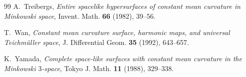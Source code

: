 \documentclass[12pt,a4paper,reqno]{amsart}
\theoremstyle{plain} %
\theoremstyle{definition}
\begin{document}
\begin{thebibliography}{99}
A.~Treibergs, {\it Entire spacelike hypersurfaces of constant mean curvature in Minkowski space}, Invent. Math. {\bf 66} (1982), 39--56.

T.~Wan, {\it Constant mean curvature surface, harmonic maps, and universal Teichm\"uller space}, J. Differential Geom. {\bf 35} (1992), 643--657.

K.~Yamada, {\it Complete space-like surfaces with constant mean curvature in the Minkowski $3$-space}, Tokyo J. Math. {\bf 11} (1988), 329--338.

\end{thebibliography}
\end{document}
